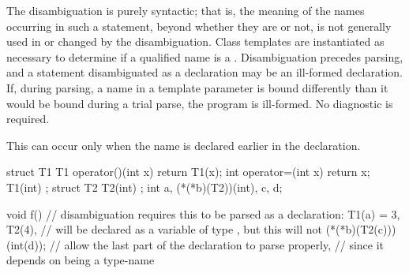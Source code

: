 \pnum
The disambiguation is purely syntactic; that is, the meaning of the
names occurring in such a statement, beyond whether they are
 or not, is not generally used in or changed by the
disambiguation. Class templates are instantiated as necessary to
determine if a qualified name is a . Disambiguation
precedes parsing, and a statement disambiguated as a declaration may be
an ill-formed declaration. If, during parsing, a name in a template
parameter is bound differently than it would be bound during a trial
parse, the program is ill-formed. No diagnostic is required.
\begin{note}
This can occur only when the name is declared earlier in the
declaration.
\end{note}
\begin{example}
\begin{codeblock}
struct T1 {
  T1 operator()(int x) { return T1(x); }
  int operator=(int x) { return x; }
  T1(int) { }
};
struct T2 { T2(int){ } };
int a, (*(*b)(T2))(int), c, d;

void f() {
  // disambiguation requires this to be parsed as a declaration:
  T1(a) = 3,
  T2(4),                        //  will be declared as a variable of type , but this will not
  (*(*b)(T2(c)))(int(d));       // allow the last part of the declaration to parse properly,
                                // since it depends on  being a type-name
}
\end{codeblock}
\end{example}
